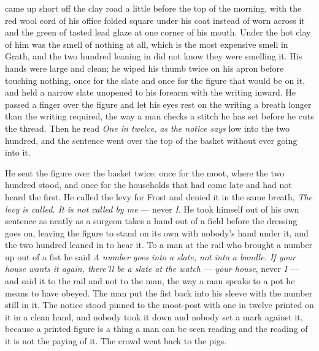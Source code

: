  came up short off the clay road a little before the top of the morning, with the red wool cord of his office folded square under his coat instead of worn across it and the green of tasted lead glaze at one corner of his mouth. Under the hot clay of him was the smell of nothing at all, which is the most expensive smell in Grath, and the two hundred leaning in did not know they were smelling it. His hands were large and clean; he wiped his thumb twice on his apron before touching nothing, once for the slate and once for the figure that would be on it, and held a narrow slate unopened to his forearm with the writing inward. He passed a finger over the figure and let his eyes rest on the writing a breath longer than the writing required, the way a man checks a stitch he has set before he cuts the thread. Then he read \emph{One in twelve, as the notice says} low into the two hundred, and the sentence went over the top of the basket without ever going into it.

He sent the figure over the basket twice: once for the moot, where the two hundred stood, and once for the households that had come late and had not heard the first. He called the levy for Frost and denied it in the same breath, \emph{The levy is called. It is not called by me} --- never \emph{I}. He took himself out of his own sentence as neatly as a surgeon takes a hand out of a field before the dressing goes on, leaving the figure to stand on its own with nobody's hand under it, and the two hundred leaned in to hear it. To a man at the rail who brought a number up out of a fist he said \emph{A number goes into a slate, not into a bundle. If your house wants it again, there'll be a slate at the watch} --- \emph{your house}, never \emph{I} --- and said it to the rail and not to the man, the way a man speaks to a pot he means to have obeyed. The man put the fist back into his sleeve with the number still in it. The notice stood pinned to the moot-post with one in twelve printed on it in a clean hand, and nobody took it down and nobody set a mark against it, because a printed figure is a thing a man can be seen reading and the reading of it is not the paying of it. The crowd went back to the pigs.

